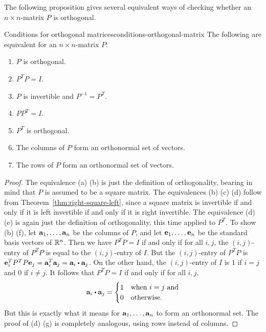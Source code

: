 The following proposition gives several equivalent ways of checking
whether an $n\times n$-matrix $P$ is orthogonal.

\begin{proposition}{Conditions for orthogonal matrices}{conditions-orthogonal-matrix}
  The following are equivalent for an $n\times n$-matrix $P$:
  \begin{enumialphparenastyle}
    \begin{enumerate}
    \item $P$ is orthogonal.
    \item $P^TP=I$.
    \item $P$ is invertible and $P^{-1}=P^T$.
    \item $PP^T=I$.
    \item $P^T$ is orthogonal.
    \item The columns of $P$ form an orthonormal set of vectors.
    \item The rows of $P$ form an orthonormal set of vectors.
    \end{enumerate}
  \end{enumialphparenastyle}
\end{proposition}

\begin{proof}
  The equivalence (a) {\textiff} (b) is just the definition of
  orthogonality, bearing in mind that $P$ is assumed to be a square
  matrix. The equivalences (b) {\textiff} (c) {\textiff} (d) follow
  from Theorem~\ref{thm:right-square-left}, since a square matrix is
  invertible if and only if it is left invertible if and only if it is
  right invertible.  The equivalence (d) {\textiff} (e) is again just
  the definition of orthogonality, this time applied to $P^T$. To show
  (b) {\textiff} (f), let $\vect{a}_1,\ldots,\vect{a}_n$ be the
  columns of $P$, and let $\vect{e}_1,\ldots,\vect{e}_n$ be the
  standard basis vectors of $\mathbb{R}^n$. Then we have $P^TP = I$ if and
  only if for all $i,j$, the $(i,j)$-entry of $P^TP$ is equal to the
  $(i,j)$-entry of $I$.  But the $(i,j)$-entry of $P^TP$ is
  $\vect{e}_i^TP^TP\vect{e}_j = \vect{a}_i^T\vect{a}_j =
  \vect{a}_i\dotprod\vect{a}_j$. On the other hand, the $(i,j)$-entry
  of $I$ is $1$ if $i=j$ and $0$ if $i\neq j$. It follows that
  $P^TP=I$ if and only if for all $i,j$,
  \begin{equation*}
    \vect{a}_i\dotprod\vect{a}_j=\begin{cases}
      1 & \mbox{when $i=j$ and} \\
      0 & \mbox{otherwise}.
    \end{cases}
  \end{equation*}
  But this is exactly what it means for $\vect{a}_1,\ldots,\vect{a}_n$
  to form an orthonormal set.
  The proof of (d) {\textiff} (g) is completely analogous, using rows
  instead of columns.
\end{proof}

